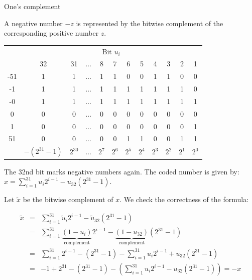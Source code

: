 \begin{vbframe}{One's complement}

A negative number $-z$ is represented by the bitwise complement of the corresponding positive number $z$.

\begin{footnotesize}
\begin{center}
  \begin{tabular}{ c | ccccccccccc}
    & \multicolumn{11}{c}{Bit $u_i$} \\
     & 32 & 31  & $\hdots$ & 8 & 7 & 6 & 5 & 4 & 3 & 2 & 1 \\
    \hline
    -51 & 1 & 1 & $\hdots$ & 1 & 1 & 0 & 0 & 1 & 1 & 0 & 0 \\
     -1 & 1 & 1 & $\hdots$ & 1 & 1 & 1 & 1 & 1 & 1 & 1 & 0 \\
     -0 & 1 & 1 & $\hdots$ & 1 & 1 & 1 & 1 & 1 & 1 & 1 & 1 \\
      0 & 0 & 0 & $\hdots$ & 0 & 0 & 0 & 0 & 0 & 0 & 0 & 0 \\
      1 & 0 & 0 & $\hdots$ & 0 & 0 & 0 & 0 & 0 & 0 & 0 & 1 \\
     51 & 0 & 0 & $\hdots$ & 0 & 0 & 1 & 1 & 0 & 0 & 1 & 1 \\
    \hline
       & $-(2^{31} - 1)$ & $2^{30}$ & $\hdots$ & $2^7$ & $2^6$ & $2^5$ & $2^4$ & $2^3$ & $2^2$ & $2^1$ & $2^0$
  \end{tabular}
\end{center}
\end{footnotesize}

The 32nd bit marks negative numbers again.
The coded number is given by: $x = \sum_{i=1}^{31} u_i 2^{i-1} - u_{32}(2^{31} - 1)$.

\framebreak

Let $\tilde x$ be the bitwise complement of $x$. We check the correctness of the formula: 

\vspace*{-.5cm}

\begin{eqnarray*}
  \tilde x &=& \sum_{i=1}^{31} \tilde u_i 2^{i-1} - \tilde u_{32}(2^{31} - 1) \\
  &=& \sum_{i=1}^{31} \underbrace{(1 - u_i)}_{\text{complement}} 2^{i-1} - \underbrace{(1 - u_{32})}_{\text{complement}}{(2^{31} - 1)}\\
  &=& \sum_{i=1}^{31} 2^{i-1} - (2^{31} - 1) - \sum_{i=1}^{31} u_i 2^{i-1} + u_{32}(2^{31} - 1)\\
  &=& -1 + 2^{31} - (2^{31} - 1) - (\sum_{i=1}^{31} u_i 2^{i-1} - u_{32}(2^{31} - 1)) = - x
\end{eqnarray*}



\end{vbframe}
